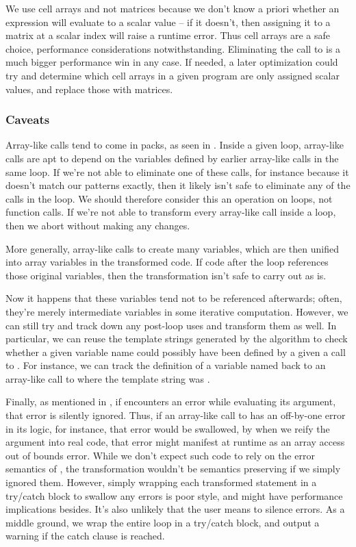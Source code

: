 We use cell arrays and not matrices because we don't know a priori whether an
expression will evaluate to a scalar value -- if it doesn't, then assigning it
to a matrix at a scalar index will raise a runtime error. Thus cell arrays are
a safe choice, performance considerations notwithstanding. Eliminating the call
to  is a much bigger performance win in any case. If needed, a later
optimization could try and determine which cell arrays in a given program are
only assigned scalar values, and replace those with matrices.

\subsubsection{Caveats}

Array-like calls tend to come in packs, as seen in .
Inside a given loop, array-like calls are apt to depend on the variables
defined by earlier array-like calls in the same loop. If we're not able to
eliminate one of these calls, for instance because it doesn't match our
patterns exactly, then it likely isn't safe to eliminate any of the calls in
the loop. We should therefore consider this an operation on loops, not function
calls. If we're not able to transform every array-like call inside a loop, then
we abort without making any changes.

More generally, array-like calls to  create many variables, which
are then unified into array variables in the transformed code. If code after
the loop references those original variables, then the transformation isn't
safe to carry out as is.

Now it happens that these variables tend not to be referenced afterwards;
often, they're merely intermediate variables in some iterative computation.
However, we can still try and track down any post-loop uses and transform them
as well. In particular, we can reuse the template strings generated by the
algorithm to check whether a given variable name could possibly have been
defined by a given a call to . For instance, we can track the
definition of a variable named  back to an array-like call to
 where the template string was .

Finally, as mentioned in , if  encounters an error
while evaluating its argument, that error is silently ignored. Thus, if an
array-like call to  has an off-by-one error in its logic, for
instance, that error would be swallowed, by when we reify the argument into
real code, that error might manifest at runtime as an array access out of
bounds error. While we don't expect such code to rely on the error semantics of
, the transformation wouldn't be semantics preserving if we simply
ignored them. However, simply wrapping each transformed statement in a
try/catch block to swallow any errors is poor style, and might have performance
implications besides. It's also unlikely that the user means to silence errors.
As a middle ground, we wrap the entire loop in a try/catch block, and output a
warning if the catch clause is reached.

